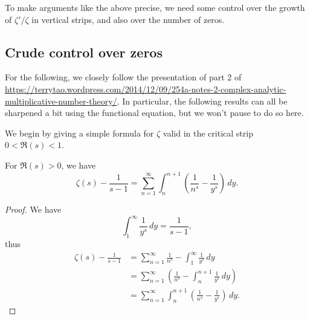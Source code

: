 \documentclass[reqno]{amsart}  \numberwithin{theorem}{section} \numberwithin{equation}{section}
\begin{document}
To make arguments like the above precise, we need some control over the growth of $ \zeta ' / \zeta $ in vertical strips, and also over the number of zeros.

\subsection{Crude control over zeros}\label{sec:cj410a1fzy}
For the following, we closely follow the presentation of part 2 of \href{these notes}{https://terrytao.wordpress.com/2014/12/09/254a-notes-2-complex-analytic-multiplicative-number-theory/}.  In particular, the following results can all be sharpened a bit using the functional equation, but we won't pause to do so here.

We begin by giving a simple formula for $\zeta$ valid in the critical strip $0 < \Re(s) < 1$.
\begin{lemma}\label{lemma:cj56e5idm1}
  For $\Re(s) > 0$, we have
  \begin{equation}\label{eq:cj41j93u44}
    \zeta(s) - \frac{1}{s - 1}
    = \sum_{n = 1}^\infty \int_n^{n+1}  \left( \frac{1}{n^s }  - \frac{1}{y^s} \right)   \, d y.
  \end{equation}
  
\end{lemma}
\begin{proof}
  We have
  \begin{equation*}
    \int_1^\infty \frac{1}{y^s } \, d y = \frac{1}{s - 1},
  \end{equation*}
  thus
  \begin{align*}
    \zeta(s) - \frac{1}{s - 1}
    &=
      \sum_{n = 1}^\infty \frac{1}{n^s } - \int_1^\infty \frac{1}{y^s } \, d y \\
    &=
      \sum_{n = 1}^\infty \left( \frac{1}{n^s } - \int_n^{n+1} \frac{1}{y^s} \, d y \right) \\
    &=
      \sum_{n = 1}^\infty \int_n^{n+1}  \left( \frac{1}{n^s }  - \frac{1}{y^s} \right)   \, d y.
  \end{align*}
\end{proof}
\end{document}
